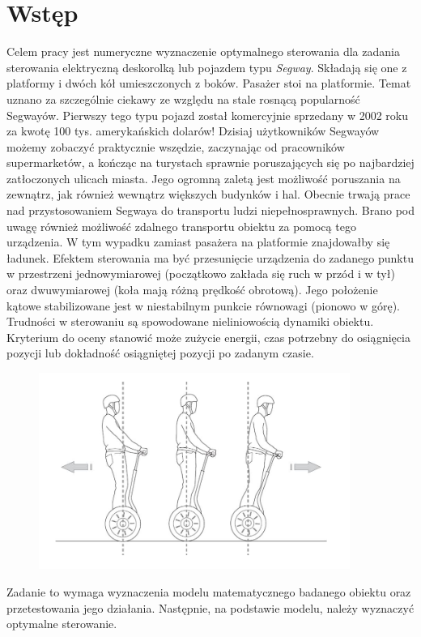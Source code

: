 \section{Wstęp}
\label{sec:wstep}

Celem pracy jest numeryczne wyznaczenie optymalnego sterowania dla zadania sterowania elektryczną deskorolką lub pojazdem typu \textit{Segway}. Składają się one z platformy i dwóch kół umieszczonych z boków. Pasażer stoi na platformie. Temat uznano za szczególnie ciekawy ze względu na stale rosnącą popularność Segwayów. Pierwszy tego typu pojazd został komercyjnie sprzedany w 2002 roku za kwotę 100 tys. amerykańskich dolarów! Dzisiaj użytkowników Segwayów możemy zobaczyć praktycznie wszędzie, zaczynając od pracowników supermarketów, a kończąc na turystach sprawnie poruszających się po najbardziej zatłoczonych ulicach miasta. Jego ogromną zaletą jest możliwość poruszania na zewnątrz, jak również wewnątrz większych budynków i hal. Obecnie trwają prace nad przystosowaniem Segwaya do transportu ludzi niepełnosprawnych. Brano pod uwagę również możliwość zdalnego transportu obiektu za pomocą tego urządzenia. W tym wypadku zamiast pasażera na platformie znajdowałby się ładunek. Efektem sterowania ma być przesunięcie urządzenia do zadanego punktu w przestrzeni jednowymiarowej (początkowo zakłada się ruch w przód i w tył) oraz dwuwymiarowej (koła mają różną prędkość obrotową). Jego położenie kątowe stabilizowane jest w niestabilnym punkcie równowagi (pionowo w górę). Trudności w sterowaniu są spowodowane nieliniowością dynamiki obiektu. Kryterium do oceny stanowić może zużycie energii, czas potrzebny do osiągnięcia pozycji lub dokładność osiągniętej pozycji po zadanym czasie. %

\begin{figure}[h]
	\centering
	\includegraphics[width=4in]{Figures/wstep_segway.jpg}
	\label{fig:wstep_segway}
\end{figure}

Zadanie to wymaga wyznaczenia modelu matematycznego badanego obiektu oraz przetestowania jego działania. Następnie, na podstawie modelu, należy wyznaczyć optymalne sterowanie.
